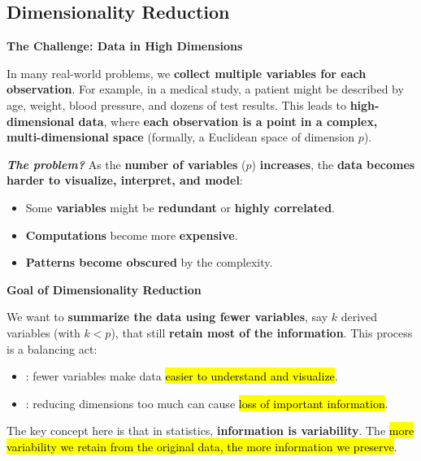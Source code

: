 \subsection{Dimensionality Reduction}

\begin{flushleft}
    \textcolor{Red2}{ \textbf{The Challenge: Data in High Dimensions}}
\end{flushleft}
In many real-world problems, we \textbf{collect multiple variables for each observation}. For example, in a medical study, a patient might be described by age, weight, blood pressure, and dozens of test results. This leads to \textbf{high-dimensional data}, where \textbf{each observation is a point in a complex, multi-dimensional space} (formally, a Euclidean space of dimension $p$).

\highspace
\textcolor{Red2}{\textbf{\emph{The problem?}}} As the \textbf{number of variables} ($p$) \textbf{increases}, the \textbf{data becomes harder to visualize, interpret, and model}:
\begin{itemize}[label=\textcolor{Red2}{}]
    \item Some \textbf{variables} might be \textbf{redundant} or \textbf{highly correlated}.
    \item \textbf{Computations} become more \textbf{expensive}.
    \item \textbf{Patterns become obscured} by the complexity.
\end{itemize}

\highspace
\begin{flushleft}
    \textcolor{Green3}{ \textbf{Goal of Dimensionality Reduction}}
\end{flushleft}
We want to \textbf{summarize the data using fewer variables}, say $k$ derived variables (with $k < p$), that still \textbf{retain most of the information}. This process is a balancing act:
\begin{itemize}
    \item {}: fewer variables make data \hl{easier to understand and visualize}.
    \item {}: reducing dimensions too much can cause \hl{loss of important information}.
\end{itemize}
The key concept here is that in statistics, \textbf{information is variability}. The \hl{more variability we retain from the original data, the more information we preserve}.

